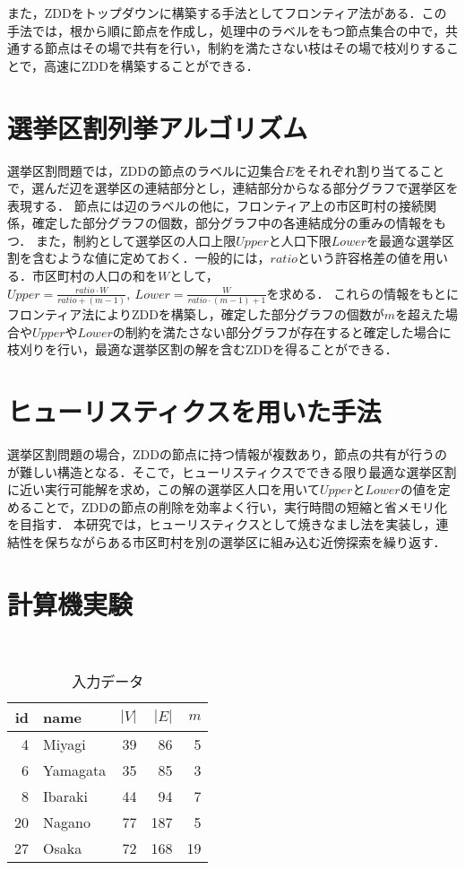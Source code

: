 \documentclass[twoside,twocolumn,11pt]{jarticle}  %
\begin{document}
また，ZDDをトップダウンに構築する手法としてフロンティア法がある．この手法では，根から順に節点を作成し，処理中のラベルをもつ節点集合の中で，共通する節点はその場で共有を行い，制約を満たさない枝はその場で枝刈りすることで，高速にZDDを構築することができる．

\section{選挙区割列挙アルゴリズム}
選挙区割問題では，ZDDの節点のラベルに辺集合$E$をそれぞれ割り当てることで，選んだ辺を選挙区の連結部分とし，連結部分からなる部分グラフで選挙区を表現する．
節点には辺のラベルの他に，フロンティア上の市区町村の接続関係，確定した部分グラフの個数，部分グラフ中の各連結成分の重みの情報をもつ．
また，制約として選挙区の人口上限$Upper$と人口下限$Lower$を最適な選挙区割を含むような値に定めておく．一般的には，$ratio$という許容格差の値を用いる．市区町村の人口の和を$W$として，$Upper=\frac{ratio \cdot W}{ratio+(m-1)}, \ Lower=\frac{W}{ratio \cdot (m-1)+1}$を求める．
これらの情報をもとにフロンティア法によりZDDを構築し，確定した部分グラフの個数が$m$を超えた場合や$Upper$や$Lower$の制約を満たさない部分グラフが存在すると確定した場合に枝刈りを行い，最適な選挙区割の解を含むZDDを得ることができる．

\section{ヒューリスティクスを用いた手法}
選挙区割問題の場合，ZDDの節点に持つ情報が複数あり，節点の共有が行うのが難しい構造となる．そこで，ヒューリスティクスでできる限り最適な選挙区割に近い実行可能解を求め，この解の選挙区人口を用いて$Upper$と$Lower$の値を定めることで，ZDDの節点の削除を効率よく行い，実行時間の短縮と省メモリ化を目指す．
本研究では，ヒューリスティクスとして焼きなまし法を実装し，連結性を保ちながらある市区町村を別の選挙区に組み込む近傍探索を繰り返す．

\section{計算機実験}

\begin{table}
　　　　\small
  \caption{入力データ}
  \label{table:input}
  \centering
  \begin{tabular}{rl|rrr}
    \hline
    id & name & $|V|$ & $|E|$ & $m$ \\
    \hline\hline
    4 & Miyagi & 39 & 86 & 5 \\
    6 & Yamagata & 35 & 85 & 3 \\
    8 & Ibaraki & 44 & 94 & 7 \\
    20 & Nagano & 77 & 187 & 5 \\
    27 & Osaka & 72 & 168 & 19 \\
    \hline
  \end{tabular}
\end{table}
\end{document}
